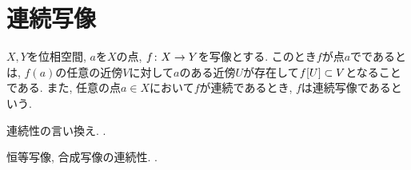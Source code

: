 \documentclass[uplatex, dvipdfmx, a4paper, 12pt, class=jsbook, crop=false]{standalone}
\begin{document}
\section{連続写像}
\label{sec:continuous-maps}

\begin{definition}
	$ X, Y $を位相空間, $ a $を$ X $の点, $ f\colon X\to Y $を写像とする.
	このとき$ f $が点$ a $でであるとは,
	$ f(a) $の任意の近傍$ V $に対して$ a $のある近傍$ U $が存在して$ \mapset{f}{U} \subset V $となることである.
	また, 任意の点$ a \in X $において$ f $が連続であるとき, $ f $は連続写像であるという.
\end{definition}

\begin{proposition}
	連続性の言い換え.
	\WIP.
\end{proposition}

恒等写像, 合成写像の連続性.
\WIP.
\end{document}
